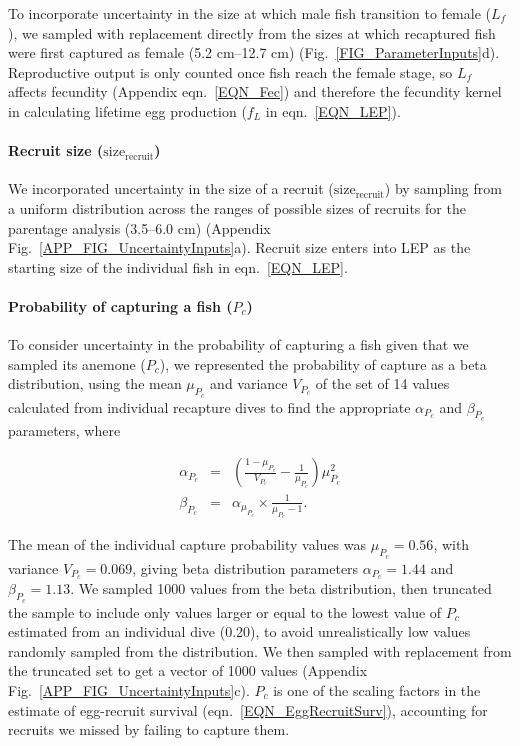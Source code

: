 \documentclass[12pt, oneside]{article}   	%
\begin{document}
To incorporate uncertainty in the size at which male fish transition to female ($L_f$), we sampled with replacement directly from the sizes at which recaptured fish were first captured as female (5.2 cm--12.7 cm) (Fig.\ \ref{FIG_ParameterInputs}d). Reproductive output is only counted once fish reach the female stage, so $L_f$ affects fecundity (Appendix eqn.\ \ref{EQN_Fec}) and therefore the fecundity kernel in calculating lifetime egg production ($f_L$ in eqn.\ \ref{EQN_LEP}).

\paragraph*{Recruit size ($\text{size}_\text{recruit}$)} %

We incorporated uncertainty in the size of a recruit ($\text{size}_\text{recruit}$) by sampling from a uniform distribution across the ranges of possible sizes of recruits for the parentage analysis (3.5--6.0 cm) (Appendix Fig.\ \ref{APP_FIG_UncertaintyInputs}a). Recruit size enters into LEP as the starting size of the individual fish in eqn.\ \ref{EQN_LEP}.

\paragraph*{Probability of capturing a fish ($P_c$)} %

To consider uncertainty in the probability of capturing a fish given that we sampled its anemone ($P_c$), we represented the probability of capture as a beta distribution, using the mean $\mu_{P_c}$ and variance $V_{P_c}$ of the set of 14 values calculated from individual recapture dives to find the appropriate $\alpha_{P_c}$ and $\beta_{P_c}$ parameters, where 

\begin{eqnarray}
\alpha_{P_c} &=& (\frac{1-\mu_{P_c}}{V_{P_c}} - \frac{1}{\mu_{P_c}}) \mu_{P_c}^2 \\
\beta_{P_c} &=& \alpha_{\mu_{P_c}} \times \frac{1}{\mu_{P_c} - 1}. \label{APP_EQN_ProbCapBetaDistParams}  %
\end{eqnarray}

The mean of the individual capture probability values was $\mu_{P_c} = 0.56$, with variance $V_{P_c} = 0.069$, giving beta distribution parameters $\alpha_{P_c} = 1.44$ and $\beta_{P_c} = 1.13$. We sampled 1000 values from the beta distribution, then truncated the sample to include only values larger or equal to the lowest value of $P_c$ estimated from an individual dive (0.20), to avoid unrealistically low values randomly sampled from the distribution. We then sampled with replacement from the truncated set to get a vector of 1000 values (Appendix Fig.\ \ref{APP_FIG_UncertaintyInputs}c). $P_c$ is one of the scaling factors in the estimate of egg-recruit survival (eqn.\ \ref{EQN_EggRecruitSurv}), accounting for recruits we missed by failing to capture them.
\end{document}

